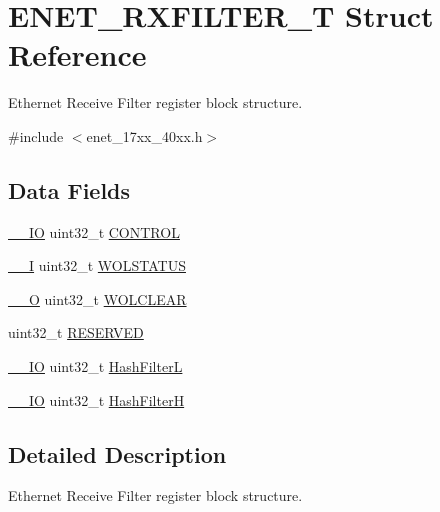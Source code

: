 \hypertarget{structENET__RXFILTER__T}{\section{E\-N\-E\-T\-\_\-\-R\-X\-F\-I\-L\-T\-E\-R\-\_\-\-T Struct Reference}
\label{structENET__RXFILTER__T}
}


Ethernet Receive Filter register block structure.  




{\ttfamily \#include $<$enet\-\_\-17xx\-\_\-40xx.\-h$>$}

\subsection*{Data Fields}
\begin{DoxyCompactItemize}
\item 
\hyperlink{core__cm3_8h_aec43007d9998a0a0e01faede4133d6be}{\-\_\-\-\_\-\-I\-O} uint32\-\_\-t \hyperlink{structENET__RXFILTER__T_a41f07a3db2876b8d2ad5da9a93dfc26b}{C\-O\-N\-T\-R\-O\-L}
\item 
\hyperlink{core__cm3_8h_af63697ed9952cc71e1225efe205f6cd3}{\-\_\-\-\_\-\-I} uint32\-\_\-t \hyperlink{structENET__RXFILTER__T_a40eedf8542d1e384d39cc5fca3fffffb}{W\-O\-L\-S\-T\-A\-T\-U\-S}
\item 
\hyperlink{core__cm3_8h_a7e25d9380f9ef903923964322e71f2f6}{\-\_\-\-\_\-\-O} uint32\-\_\-t \hyperlink{structENET__RXFILTER__T_acc4b5d489de8f522d567436de4b10d91}{W\-O\-L\-C\-L\-E\-A\-R}
\item 
uint32\-\_\-t \hyperlink{structENET__RXFILTER__T_a519bb4adc188b23217e7c6e41e2e0ea8}{R\-E\-S\-E\-R\-V\-E\-D}
\item 
\hyperlink{core__cm3_8h_aec43007d9998a0a0e01faede4133d6be}{\-\_\-\-\_\-\-I\-O} uint32\-\_\-t \hyperlink{structENET__RXFILTER__T_ad011f3c2f5381b81e57c42420bb98644}{Hash\-Filter\-L}
\item 
\hyperlink{core__cm3_8h_aec43007d9998a0a0e01faede4133d6be}{\-\_\-\-\_\-\-I\-O} uint32\-\_\-t \hyperlink{structENET__RXFILTER__T_a2d82ff2319b5b50a63698fd062c2fe7d}{Hash\-Filter\-H}
\end{DoxyCompactItemize}


\subsection{Detailed Description}
Ethernet Receive Filter register block structure. 

